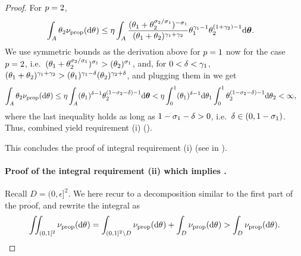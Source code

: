 \begin{proof}
    
    For $p = 2$, 
     \begin{align*}
    \int_A \variantfreqperpop{2}\ratemeasproposed(\de\vecvariantfreq{}) & \le \eta \int_A \frac{(\variantfreqperpop{1}+\variantfreqperpop{2}^{\rate{2}/\rate{1}})^{-\rate{1}}}{(\variantfreqperpop{1}+\variantfreqperpop{2})^{\corr{1}+\corr{2}}}\variantfreqperpop{1}^{\corr{1}-1}\variantfreqperpop{2}^{(1+\corr{2})-1}\de\btheta.
        \end{align*} 
	We use symmetric bounds as the derivation above for $p=1$ now for the case $p=2$, i.e.\ $(\theta_{1}+\theta_{2}^{\sigma_{2}/\sigma_{1}})^{\sigma_{1}}>(\theta_{2})^{\sigma_{1}}$, and, for $0<\delta < \gamma_{1}$, $(\theta_{1}+\theta_{2})^{\gamma_{1}+\gamma_{2}}>(\theta_{1})^{\gamma_{1} - \delta } (\theta_{2})^{\gamma_{2} + \delta}$, and plugging them in we get
     \begin{align}
    \int_A \variantfreqperpop{2}\ratemeasproposed(\de\vecvariantfreq{}) & \le \eta \int_A (\variantfreqperpop{1})^{\delta-1}\variantfreqperpop{2}^{(1-\rate{2}-\delta)-1}\de\btheta
    <\eta \int_0^1 (\variantfreqperpop{1})^{\delta-1} \de \variantfreqperpop{1} \int_0^1 \variantfreqperpop{2}^{(1-\rate{2}-\delta)-1}\de \variantfreqperpop{2} < \infty,  \label{eq:req_p2}
        \end{align} 	
        where the last inequality holds as long as $1-\sigma_{1}-\delta > 0$, i.e.\ $\delta \in (0,1-\sigma_{1})$. Thus,  combined yield requirement (i) ().
        
        This concludes the proof of integral requirement (i) (see  in ).


    \paragraph{Proof of the integral requirement (ii)  which implies .}
    Recall $D=(0,\epsilon]^2$. We here recur to a decomposition similar to the first part of the proof, and rewrite the integral as
	\[
		\iint_{(0,1]^2} \ratemeasproposed(\de \vecvariantfreq{} )= \int_{(0,1]^2\setminus D} \ratemeasproposed(\de\vecvariantfreq{}) + \int_D \ratemeasproposed(\de\vecvariantfreq{}) >  \int_D \ratemeasproposed(\de\vecvariantfreq{}).
	\]


\end{proof}
